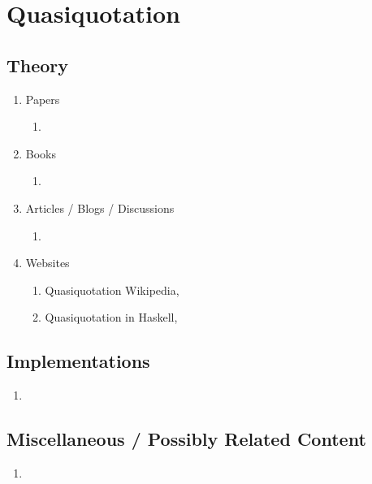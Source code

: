 \documentclass[thesis-solanki.tex]{subfiles}
\begin{document}
\chapter{Quasiquotation}\label{chap:quasiquotation}

\section{Theory}
\begin{enumerate}

\item Papers
\begin{enumerate}
\item
\end{enumerate}

\item Books
\begin{enumerate}
\item
\end{enumerate}

\item Articles / Blogs / Discussions
\begin{enumerate}
\item
\end{enumerate}

\item Websites
\begin{enumerate}
\item Quasiquotation Wikipedia, \cite{wikiquasi}
\item Quasiquotation in Haskell, \cite{haskellquasi}
\end{enumerate}

\end{enumerate}


\section{Implementations}
\begin{enumerate}
\item
\end{enumerate}

\section{Miscellaneous / Possibly Related Content}
\begin{enumerate}
\item
\end{enumerate}
\end{document}
